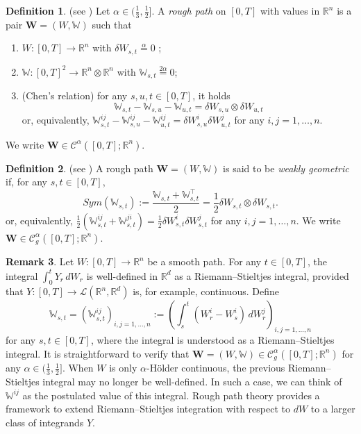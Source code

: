 \documentclass[10pt, a4paper]{article} %
\newcommand{\R}{\mathbb{R}}
\theoremstyle{definition}
\newtheorem{defn}{Definition}[section]
\newtheorem{rmk}[defn]{Remark}
\theoremstyle{plain}
\begin{document}
    \begin{defn} \label{def:roughpath} (see \cite[Definition 2.1]{FRIZHAIRER})
    Let $\alpha \in (\frac{1}{3},\frac{1}{2}]$.
    A \textit{rough path} on $[0,T]$ with values in $\R^n$ is a pair $\mathbf{W}=(W,\mathbb{W})$ such that \begin{enumerate} \renewcommand{\labelenumi}{(\alph{enumi})}
    \item $W:[0,T] \to \R^n$ with $\delta W_{s,t} \overset{\alpha}{=} 0$ ;
    \item $\mathbb{W}:[0,T]^2 \to \R^n \otimes \R^n$ with $\mathbb{W}_{s,t} \overset{2\alpha}{=} 0$;
    \item (Chen's relation) for any $s,u,t \in [0,T]$, it holds \begin{equation} \label{eq:chenrelation}
        \mathbb{W}_{s,t}-\mathbb{W}_{s,u}-\mathbb{W}_{u,t} = \delta W_{s,u}\otimes\delta W_{u,t}
    \end{equation} or, equivalently, $\mathbb{W}_{s,t}^{ij}-\mathbb{W}_{s,u}^{ij}-\mathbb{W}_{u,t}^{ij} = \delta W_{s,u}^i \delta W_{u,t}^j$ for any $i,j=1,\dots,n$.
\end{enumerate}
We write $\mathbf{W}\in \mathscr{C}^\alpha([0,T];\R^n)$.
\end{defn}

\begin{defn} (see \cite[ Section 2.2]{FRIZHAIRER})
    A rough path $\mathbf{W}=(W,\mathbb{W})$ is said to be \textit{weakly geometric} if, for any $s,t \in [0,T]$, \begin{equation*}
    Sym(\mathbb{W}_{s,t}):=\frac{\mathbb{W}_{s,t}+\mathbb{W}_{s,t}^\top}{2} = \frac{1}{2}\delta W_{s,t} \otimes \delta W_{s,t}.
    \end{equation*}
    or, equivalently, $\frac{1}{2}(\mathbb{W}_{s,t}^{ij}+\mathbb{W}_{s,t}^{ji}) = \frac{1}{2}\delta W_{s,t}^i \delta W_{s,t}^j$ for any $i,j=1,\dots,n$. 
    We write $\mathbf{W}\in \mathscr{C}^\alpha_g([0,T];\R^n)$.
\end{defn}

\begin{rmk}
    Let $W:[0,T] \to \R^n$ be a smooth path. For any $t \in [0,T]$, the integral $\int_0^t Y_r \, dW_r$ is well-defined in $\R^d$ as a Riemann--Stieltjes integral, provided that $Y :[0,T] \to \mathscr{L}(\R^n,\R^d)$ is, for example, continuous. 
    Define \begin{equation*}
        \mathbb{W}_{s,t} = (\mathbb{W}_{s,t}^{ij})_{i,j=1,\dots,n} := \left(\int_s^t (W_r^i - W_s^i) \, dW^j_r \right)_{i,j=1,\dots,n}  
    \end{equation*}
    for any $s,t \in [0,T]$, where the integral is understood as a Riemann--Stieltjes integral.
    It is straightforward to verify that $\mathbf{W} =(W,\mathbb{W}) \in \mathscr{C}^\alpha_g([0,T];\R^n)$ for any $\alpha \in (\frac{1}{3}, \frac{1}{2}]$. 
    When $W$ is only $\alpha$-H\"older continuous, the previous Riemann--Stieltjes integral may no longer be well-defined. In such a case, we can think of $\mathbb{W}^{ij}$ as the postulated value of this integral.
    Rough path theory provides a framework to extend Riemann--Stieltjes integration with respect to $dW$ to a larger class of integrands $Y$. 
\end{rmk}
\end{document}
